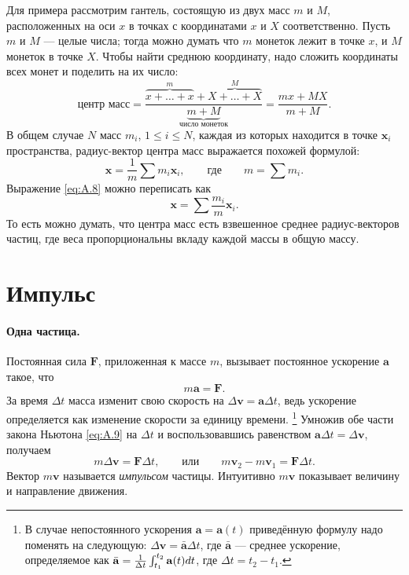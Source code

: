 Для примера рассмотрим гантель, состоящую из двух масс $m$ и $M$, расположенных на оси $x$ в точках с координатами $x$ и $X$ соответственно.
Пусть $m$ и $M$ --- целые числа;
тогда можно думать что $m$ монеток лежит в точке $x$,
и $M$ монеток в точке $X$.
Чтобы найти среднюю координату, надо сложить координаты всех монет и поделить на их число:
\[
\text{центр масс} =
\frac{\overbrace{x + \dots + x}^{m} + \overbrace{X + \dots + X}^{M}}{\underbrace{m+M}_{\text{число монеток}}}
=\frac{mx + MX}{m+M}.
\]
В общем случае $N$ масс $m_i$, $1 \le i \le N$, каждая из
которых находится в точке $\mathbf{x}_i$ пространства, радиус-вектор
центра масс выражается похожей формулой:
\begin{equation}
    \mathbf{x} = \frac{1}{m} \sum m_i  \mathbf{x}_i,
    \qquad\text{где}\qquad m = \sum m_i.
    \label{eq:A.8}
\end{equation}
Выражение \eqref{eq:A.8} можно переписать как
\[
\mathbf{x} = \sum \frac{m_i}{m}  \mathbf{x}_i.
\]
То есть можно думать, что центра масс есть взвешенное среднее радиус-векторов частиц, где веса пропорциональны вкладу каждой массы в общую массу.

\section{Импульс}\label{Импульс}\label{sec:A.4}

\paragraph{Одна частица.}
Постоянная сила $\mathbf{F}$, приложенная
к массе $m$, вызывает постоянное ускорение $\mathbf{a}$ такое, что
\begin{equation}
    m \mathbf{a} = \mathbf{F}.
    \label{eq:A.9}
\end{equation}
За время $\Delta t$ масса изменит свою скорость на
$\Delta \mathbf{v} = \mathbf{a}\Delta t$, ведь ускорение определяется как изменение скорости за единицу времени.%
\footnote{В случае непостоянного ускорения $\mathbf{a}= \mathbf{a}(t)$ приведённую формулу надо поменять на следующую: $\Delta \mathbf{v} = \bar{\mathbf{a}}  \Delta t$,
где $\bar{\mathbf{a}}$ --- среднее ускорение, определяемое как
$\bar{\mathbf{a}} \z= \frac{1}{\Delta t} \int_{t_1}^{t_2} \mathbf{a}(t) dt$,
где $\Delta t=t_2-t_1$.
}
Умножив обе части закона Ньютона \eqref{eq:A.9} на $\Delta t$
и воспользовавшись равенством $\mathbf{a}\Delta t = \Delta \mathbf{v}$, получаем
\begin{equation}
m \Delta \mathbf{v} = \mathbf{F}\Delta t,
\qquad \text{или} \qquad
m \mathbf{v}_2 - m \mathbf{v}_1 = \mathbf{F}\Delta t.
\label{eq:A.10}
\end{equation}
Вектор $m\mathbf{v}$ называется \textit{импульсом} частицы.
Интуитивно $m\mathbf{v}$ показывает величину и направление движения.


